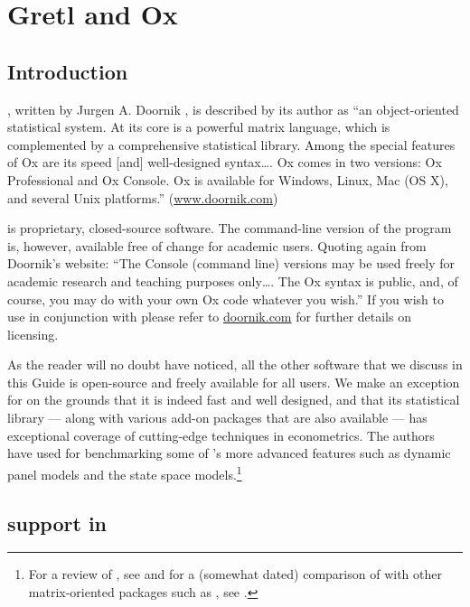 \chapter{Gretl and Ox}
\label{chap:gretlOx}

\section{Introduction}
\label{Ox-intro}

, written by Jurgen A. Doornik \citep[see][]{doornik07}, is
described by its author as ``an object-oriented statistical system. At
its core is a powerful matrix language, which is complemented by a
comprehensive statistical library. Among the special features of Ox
are its speed [and] well-designed syntax\dots{}.  Ox comes in two
versions: Ox Professional and Ox Console. Ox is available for Windows,
Linux, Mac (OS X), and several Unix platforms.''
(\url{www.doornik.com})

 is proprietary, closed-source software.  The command-line
version of the program is, however, available free of change for
academic users.  Quoting again from Doornik's website: ``The
Console (command line) versions may be used freely for academic
research and teaching purposes only\dots{}. The Ox syntax is public,
and, of course, you may do with your own Ox code whatever you wish.''
If you wish to use  in conjunction with  please
refer to \url{doornik.com} for further details on licensing.

As the reader will no doubt have noticed, all the other software that
we discuss in this Guide is open-source and freely available for all
users.  We make an exception for  on the grounds that it is
indeed fast and well designed, and that its statistical library ---
along with various add-on packages that are also available --- has
exceptional coverage of cutting-edge techniques in econometrics.  The
 authors have used  for benchmarking some of
's more advanced features such as dynamic panel models and
the state space models.\footnote{For a review of , see
  \cite{cribari-neto03} and for a (somewhat dated) comparison
  of  with other matrix-oriented packages such as ,
  see \cite{steinhaus99}.}

\section{ support in }
\label{sec:Ox-support}

